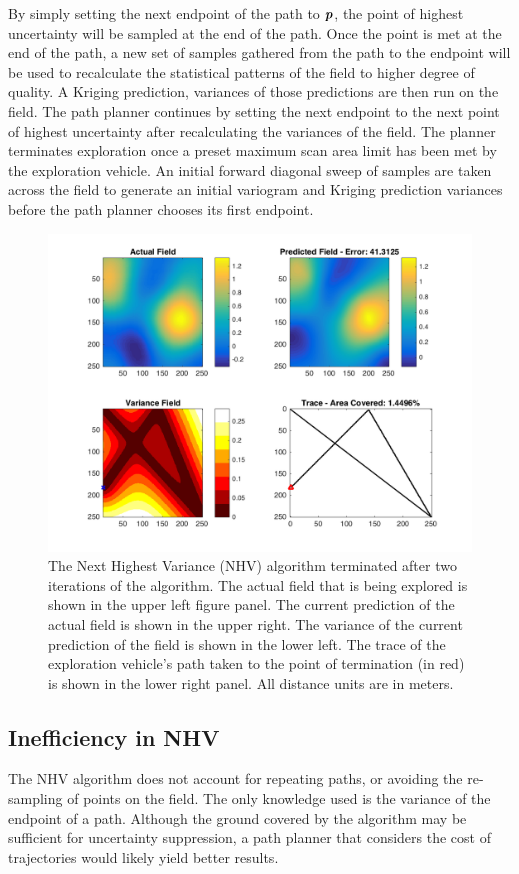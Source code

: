 By simply setting the next endpoint of the path to ${\it{\boldsymbol{p}}}$, the point of highest uncertainty will be sampled at the end of the path. Once the point is met at the end of the path, a new set of samples gathered from the path to the endpoint will be used to recalculate the statistical patterns of the field to higher degree of quality. A Kriging prediction, variances of those predictions are then run on the field. The path planner continues by setting the next endpoint to the next point of highest uncertainty after recalculating the variances of the field. The planner terminates exploration once a preset maximum scan area limit has been met by the exploration vehicle. An initial forward diagonal sweep of samples are taken across the field to generate an initial variogram and Kriging prediction variances before the path planner chooses its first endpoint.

\begin{figure}[hb!]
	\centering
	\includegraphics[width=0.95\linewidth]{figures/nhv_4panel.png}
    \captionsetup{skip=0.20\baselineskip}
	\ssp
	\caption{The Next Highest Variance (NHV) algorithm terminated after two iterations of the algorithm. The actual field that is being explored is shown in the upper left figure panel. The current prediction of the actual field is shown in the upper right. The variance of the current prediction of the field is shown in the lower left. The trace of the exploration vehicle's path taken to the point of termination (in red) is shown in the lower right panel. All distance units are in meters.}
	\label{fig:nhvpp}
\end{figure}

\subsection{Inefficiency in NHV}
The NHV algorithm does not account for repeating paths, or avoiding the re-sampling of points on the field. The only knowledge used is the variance of the endpoint of a path. Although the ground covered by the algorithm may be sufficient for uncertainty suppression, a path planner that considers the cost of trajectories would likely yield better results.

